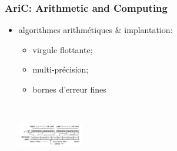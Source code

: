 \documentclass[c]{beamer}
\begin{document}
\begin{frame}
\frametitle{AriC: Arithmetic and Computing}
\begin{itemize}
\item algorithmes arithmétiques $\&$ implantation:\\ %
  \begin{minipage}{7cm}  
    \begin{itemize}
    \item %
      virgule flottante;
    \item %
      multi-précision;
    \item bornes d'erreur fines
      \end{itemize} \end{minipage}~~
      \begin{minipage}{3cm}
      \includegraphics[width=2.9cm]{VisiteAERES2014/Figures/archisin.pdf}
    \end{minipage}


\end{itemize}
\end{frame}
\end{document}
